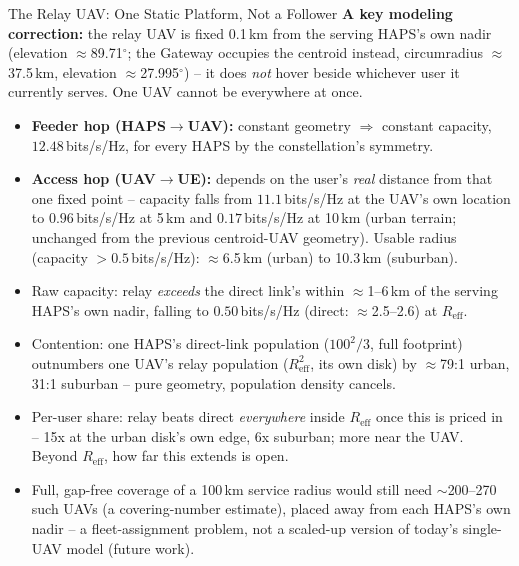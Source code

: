 \documentclass[aspectratio=169]{beamer}
\begin{document}
\begin{frame}{The Relay UAV: One Static Platform, Not a Follower}
\footnotesize
\textbf{A key modeling correction:} the relay UAV is fixed 0.1\,km from
the serving HAPS's own nadir (elevation $\approx$89.71$^\circ$; the
Gateway occupies the centroid instead, circumradius $\approx$37.5\,km,
elevation $\approx$27.995$^\circ$) -- it does \emph{not} hover beside
whichever user it currently serves. One UAV cannot be everywhere at once.
\vspace{2mm}
\begin{itemize}\setlength{\itemsep}{3pt}
  \item \textbf{Feeder hop (HAPS$\to$UAV):} constant geometry $\Rightarrow$
        constant capacity, $12.48$\,bits/s/Hz, for every HAPS by the
        constellation's symmetry.
  \item \textbf{Access hop (UAV$\to$UE):} depends on the user's \emph{real}
        distance from that one fixed point -- capacity falls from
        $11.1$\,bits/s/Hz at the UAV's own location to $0.96$\,bits/s/Hz
        at 5\,km and $0.17$\,bits/s/Hz at 10\,km (urban terrain; unchanged
        from the previous centroid-UAV geometry). Usable radius (capacity
        $>0.5$\,bits/s/Hz): $\approx$6.5\,km (urban) to 10.3\,km (suburban).
  \item Raw capacity: relay \emph{exceeds} the direct link's within
        $\approx$1--6\,km of the serving HAPS's own nadir, falling to
        $0.50$\,bits/s/Hz (direct: $\approx$2.5--2.6) at $R_\mathrm{eff}$.
  \item Contention: one HAPS's direct-link population ($100^2/3$, full
        footprint) outnumbers one UAV's relay population
        ($R_\mathrm{eff}^2$, its own disk) by $\approx$79:1 urban,
        31:1 suburban -- pure geometry, population density cancels.
  \item Per-user share: relay beats direct \emph{everywhere} inside
        $R_\mathrm{eff}$ once this is priced in -- 15x at the urban
        disk's own edge, 6x suburban; more near the UAV. Beyond
        $R_\mathrm{eff}$, how far this extends is open.
  \item Full, gap-free coverage of a 100\,km service radius would still
        need $\sim$200--270 such UAVs (a covering-number estimate),
        placed away from each HAPS's own nadir -- a
        fleet-assignment problem, not a scaled-up version of today's
        single-UAV model (future work).
\end{itemize}
\end{frame}
\end{document}

